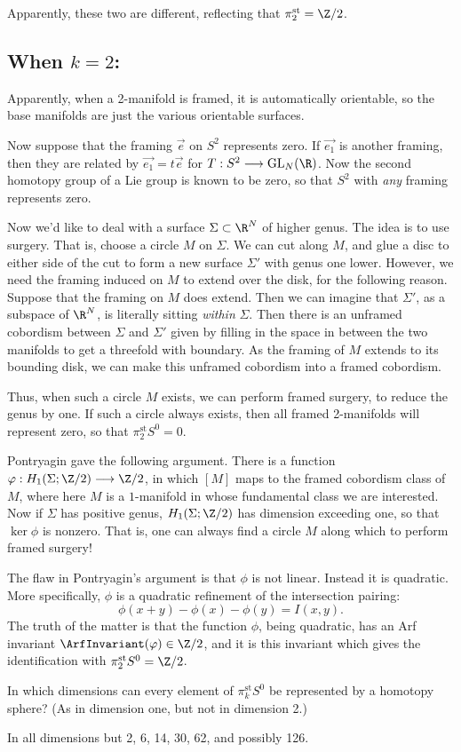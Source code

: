 \documentclass[11pt]{article}
\begin{document}
Apparently, these two are different, reflecting that $\pi_2^\text{st}=\Z/2$.
\subsection*{When \texorpdfstring{$k=2$}{k=2}:}
Apparently, when a 2-manifold is framed, it is automatically orientable, so the
base manifolds are just the various orientable surfaces.

Now suppose that the framing $\overrightarrow{e}$ on $S^2$ represents zero. If
$\overrightarrow{e_1}$ is another framing, then they are related by
$\overrightarrow{e_1}=t\overrightarrow{e}$ for $T:S^2\to\GL_N(\R)$. Now the
second homotopy group of a Lie group is known to be zero, so that $S^2$ with
\emph{any} framing represents zero.

Now we'd like to deal with a surface $\Sigma\subset\R^N$ of higher genus. The
idea is to use surgery. That is, choose a circle $M$ on $\Sigma$. We can cut
along $M$, and glue a disc to either side of the cut to form a new surface
$\Sigma'$ with genus one lower. However, we need the framing induced on $M$ to
extend over the disk, for the following reason. Suppose that the framing on $M$
does extend. Then we can imagine that $\Sigma'$, as a subspace of $\R^N$, is
literally sitting \emph{within} $\Sigma$. Then there is an unframed cobordism
between $\Sigma$ and $\Sigma'$ given by filling in the space in between the two
manifolds to get a threefold with boundary. As the framing of $M$ extends to its
bounding disk, we can make this unframed cobordism into a framed cobordism.

Thus, when such a circle $M$ exists, we can perform framed surgery, to reduce
the genus by one. If such a circle always exists, then all framed 2-manifolds
will represent zero, so that $\pi_2^\text{st}S^0=0$.

Pontryagin gave the following argument. There is a function
$\phi:H_1(\Sigma;\Z/2)\to\Z/2$, in which $[M]$ maps to the framed cobordism
class of $M$, where here $M$ is a $1$-manifold in whose fundamental class we are
interested. Now if $\Sigma$ has positive genus, $H_1(\Sigma;\Z/2)$ has dimension
exceeding one, so that $\ker\phi$ is nonzero. That is, one can always find a
circle $M$ along which to perform framed surgery!

The flaw in Pontryagin's argument is that $\phi$ is not linear. Instead it is
quadratic. More specifically, $\phi$ is a quadratic refinement of the
intersection pairing:
\[\phi(x+y)-\phi(x)-\phi(y)=I(x,y).\]
The truth of the matter is that the function $\phi$, being quadratic, has an Arf
invariant $\ArfInvariant(\phi)\in\Z/2$, and it is this invariant which gives the
identification with $\pi_2^\text{st}S^0=\Z/2$.
\begin{question}
In which dimensions can every element of $\pi_k^\text{st}S^0$ be represented by a homotopy sphere? (As in dimension one, but not in dimension 2.)
\end{question}
\begin{answer}
In all dimensions but 2, 6, 14, 30, 62, and possibly 126.
\end{answer}
\end{document}
